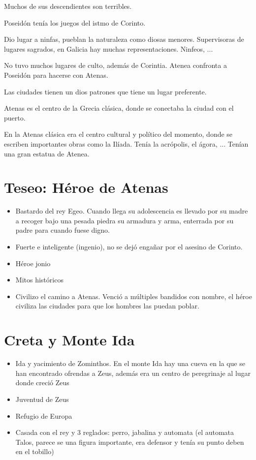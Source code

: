 Muchos de sus descendientes son terribles.

Poseidón tenía los juegos del istmo de Corinto.

Dio lugar a ninfas, pueblan la naturaleza como diosas menores. Supervisoras de lugares sagrados, en Galicia hay muchas representaciones. Ninfeos, ...

No tuvo muchos lugares de culto, además de Corintia. Atenea confronta a Poseidón para hacerse con Atenas.

Las ciudades tienen un dios patrones que tiene un lugar preferente.

Atenas es el centro de la Grecia clásica, donde se conectaba la ciudad con el puerto.

En la Atenas clásica era el centro cultural y político del momento, donde se escriben importantes obras como la Ilíada. Tenía la acrópolis, el ágora, ... Tenían una gran estatua de Atenea.

\section{Teseo: Héroe de Atenas}
\begin{itemize}
    \item Bastardo del rey Egeo. Cuando llega su adolescencia es llevado por su madre a recoger bajo una pesada piedra su armadura y arma, enterrada por su padre para cuando fuese digno.
    \item Fuerte e inteligente (ingenio), no se dejó engañar por el asesino de Corinto. 
    \item Héroe jonio
    \item Mitos históricos
    \item Civilizo el camino a Atenas. Venció a múltiples bandidos con nombre, el héroe civiliza las ciudades para que los hombres las puedan poblar.
\end{itemize}

\section{Creta y Monte Ida}
\begin{itemize}
    \item Ida y yacimiento de Zominthos. En el monte Ida hay una cueva en la que se han encontrado ofrendas a Zeus, además era un centro de peregrinaje al lugar donde creció Zeus
    \item Juventud de Zeus
    \item Refugio de Europa
    \item Casada con el rey y 3 reglados: perro, jabalina y automata (el automata Talos, parece se una figura importante, era defensor y tenía su punto deben en el tobillo)
\end{itemize}


